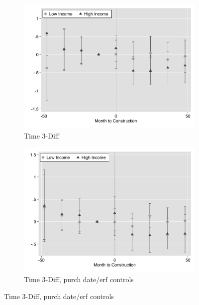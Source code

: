 \documentclass[12pt]{article}
\begin{document}
\begin{figure}
 \begin{subfigure}[b]{0.48\textwidth}
                    \caption[Network2]%
            {{\footnotesize Time 3-Diff}}    
            \label{fig:prefor}
            \centering
            \includegraphics[width=\textwidth,trim={0.3cm .3cm 0.1cm 0cm}, clip=true]{figures/price_time_3d_no_ctrl}
        \end{subfigure}
        \hfill
        \begin{subfigure}[b]{0.48\textwidth}
                    \caption[Network2]%
            {{\footnotesize Time 3-Diff, purch date/erf controls}}    
            \label{fig:prefor}
            \centering
            \includegraphics[width=\textwidth,trim={0.3cm .3cm 0.1cm 0cm}, clip=true]{figures/price_time_3d_ctrl}

\end{subfigure}
\end{figure}
\end{document}
